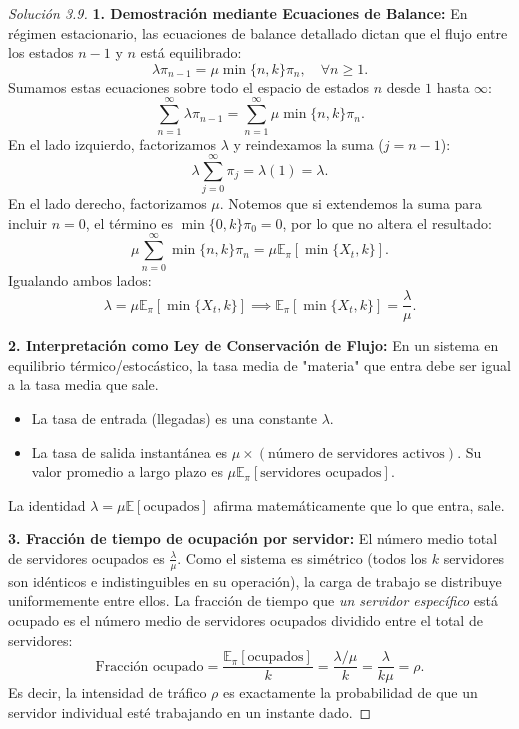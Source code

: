 \documentclass[10pt,a4paper]{article}
\begin{document}
\begin{proof}[Solución 3.9]
    \textbf{1. Demostración mediante Ecuaciones de Balance:}
    En régimen estacionario, las ecuaciones de balance detallado dictan que el flujo entre los estados $n-1$ y $n$ está equilibrado:
    \[ \lambda \pi_{n-1} = \mu \min\{n, k\} \pi_n, \quad \forall n \ge 1. \]
    Sumamos estas ecuaciones sobre todo el espacio de estados $n$ desde $1$ hasta $\infty$:
    \[ \sum_{n=1}^\infty \lambda \pi_{n-1} = \sum_{n=1}^\infty \mu \min\{n, k\} \pi_n. \]
    En el lado izquierdo, factorizamos $\lambda$ y reindexamos la suma ($j = n-1$):
    \[ \lambda \sum_{j=0}^\infty \pi_j = \lambda (1) = \lambda. \]
    En el lado derecho, factorizamos $\mu$. Notemos que si extendemos la suma para incluir $n=0$, el término es $\min\{0, k\}\pi_0 = 0$, por lo que no altera el resultado:
    \[ \mu \sum_{n=0}^\infty \min\{n, k\} \pi_n = \mu \mathbb{E}_\pi[\min\{X_t, k\}]. \]
    Igualando ambos lados:
    \[ \lambda = \mu \mathbb{E}_\pi[\min\{X_t, k\}] \implies \mathbb{E}_\pi[\min\{X_t, k\}] = \frac{\lambda}{\mu}. \]

    \textbf{2. Interpretación como Ley de Conservación de Flujo:}
    En un sistema en equilibrio térmico/estocástico, la tasa media de "materia" que entra debe ser igual a la tasa media que sale. 
    \begin{itemize}
        \item La tasa de entrada (llegadas) es una constante $\lambda$.
        \item La tasa de salida instantánea es $\mu \times (\text{número de servidores activos})$. Su valor promedio a largo plazo es $\mu \mathbb{E}_\pi[\text{servidores ocupados}]$.
    \end{itemize}
    La identidad $\lambda = \mu \mathbb{E}[\text{ocupados}]$ afirma matemáticamente que lo que entra, sale. 

    \textbf{3. Fracción de tiempo de ocupación por servidor:}
    El número medio total de servidores ocupados es $\frac{\lambda}{\mu}$. 
    Como el sistema es simétrico (todos los $k$ servidores son idénticos e indistinguibles en su operación), la carga de trabajo se distribuye uniformemente entre ellos.
    La fracción de tiempo que \textit{un servidor específico} está ocupado es el número medio de servidores ocupados dividido entre el total de servidores:
    \[ \text{Fracción ocupado} = \frac{\mathbb{E}_\pi[\text{ocupados}]}{k} = \frac{\lambda / \mu}{k} = \frac{\lambda}{k\mu} = \rho. \]
    Es decir, la intensidad de tráfico $\rho$ es exactamente la probabilidad de que un servidor individual esté trabajando en un instante dado.
\end{proof}
\end{document}
